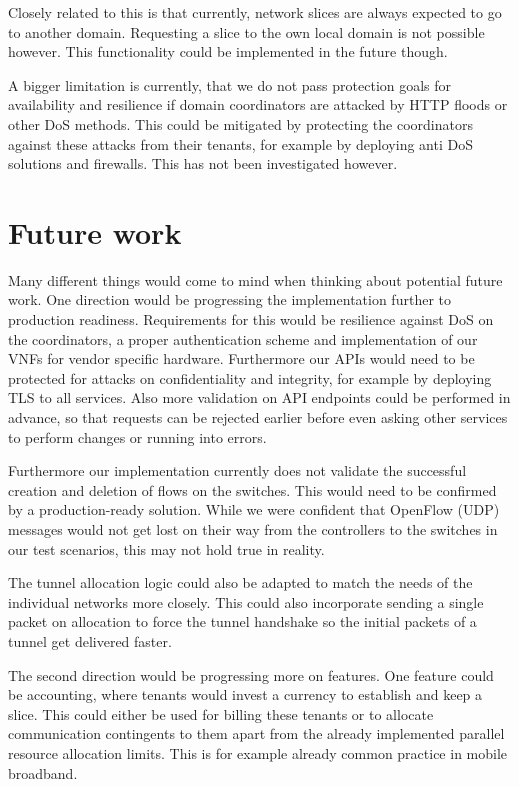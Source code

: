 Closely related to this is that currently, network slices are always expected to go to another domain. Requesting a slice to the own local domain is not possible however. This functionality could be implemented in the future though.

A bigger limitation is currently, that we do not pass protection goals for availability and resilience if domain coordinators are attacked by HTTP floods or other DoS methods. This could be mitigated by protecting the coordinators against these attacks from their tenants, for example by deploying anti DoS solutions and firewalls. This has not been investigated however.

\section{Future work}
Many different things would come to mind when thinking about potential future work. One direction would be progressing the implementation further to production readiness. Requirements for this would be resilience against DoS on the coordinators, a proper authentication scheme and implementation of our VNFs for vendor specific hardware. Furthermore our APIs would need to be protected for attacks on confidentiality and integrity, for example by deploying TLS to all services. Also more validation on API endpoints could be performed in advance, so that requests can be rejected earlier before even asking other services to perform changes or running into errors.

Furthermore our implementation currently does not validate the successful creation and deletion of flows on the switches. This would need to be confirmed by a production-ready solution. While we were confident that OpenFlow (UDP) messages would not get lost on their way from the controllers to the switches in our test scenarios, this may not hold true in reality.

The tunnel allocation logic could also be adapted to match the needs of the individual networks more closely. This could also incorporate sending a single packet on allocation to force the tunnel handshake so the initial packets of a tunnel get delivered faster.

The second direction would be progressing more on features. One feature could be accounting, where tenants would invest a currency to establish and keep a slice. This could either be used for billing these tenants or to allocate communication contingents to them apart from the already implemented parallel resource allocation limits. This is for example already common practice in mobile broadband.

